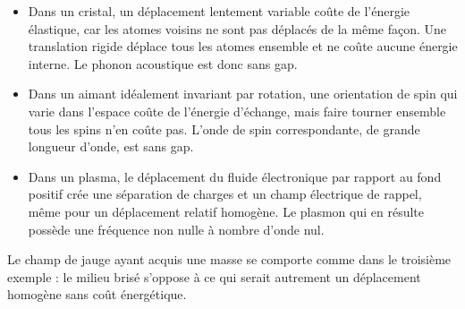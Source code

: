 \begin{itemize}\item Dans un cristal, un déplacement lentement variable coûte de l’énergie élastique, car les atomes voisins ne sont pas déplacés de la même façon. Une translation rigide déplace tous les atomes ensemble et ne coûte aucune énergie interne. Le phonon acoustique est donc sans gap.
  \item Dans un aimant idéalement invariant par rotation, une orientation de spin qui varie dans l’espace coûte de l’énergie d’échange, mais faire tourner ensemble tous les spins n’en coûte pas. L’onde de spin correspondante, de grande longueur d’onde, est sans gap.
  \item Dans un plasma, le déplacement du fluide électronique par rapport au fond positif crée une séparation de charges et un champ électrique de rappel, même pour un déplacement relatif homogène. Le plasmon qui en résulte possède une fréquence non nulle à nombre d’onde nul.
\end{itemize}

Le champ de jauge ayant acquis une masse se comporte comme dans le troisième exemple : le milieu brisé s’oppose à ce qui serait autrement un déplacement homogène sans coût énergétique.

\begin{classroomqa}\end{classroomqa}

\begin{classroomqa}\end{classroomqa}

